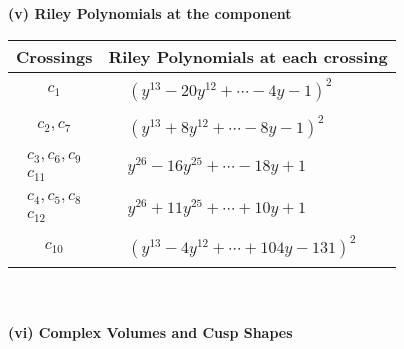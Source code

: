\documentclass[1p]{elsarticle_modified}
\theoremstyle{definition}
\begin{document}
\newpage\renewcommand{\arraystretch}{1}
\flushleft \textbf{(v) Riley Polynomials at the component}\newline \\
\begin{tabular}{m{50pt}|m{274pt}}
Crossings & \hspace{64pt}Riley Polynomials at each crossing \\
\hline $$\begin{aligned}c_{1}\end{aligned}$$&$\begin{aligned}
&(y^{13}-20 y^{12}+\cdots-4 y-1)^{2}
\end{aligned}$\\
\hline $$\begin{aligned}c_{2},c_{7}\end{aligned}$$&$\begin{aligned}
&(y^{13}+8 y^{12}+\cdots-8 y-1)^{2}
\end{aligned}$\\
\hline $$\begin{aligned}c_{3},c_{6},c_{9}\\c_{11}\end{aligned}$$&$\begin{aligned}
&y^{26}-16 y^{25}+\cdots-18 y+1
\end{aligned}$\\
\hline $$\begin{aligned}c_{4},c_{5},c_{8}\\c_{12}\end{aligned}$$&$\begin{aligned}
&y^{26}+11 y^{25}+\cdots+10 y+1
\end{aligned}$\\
\hline $$\begin{aligned}c_{10}\end{aligned}$$&$\begin{aligned}
&(y^{13}-4 y^{12}+\cdots+104 y-131)^{2}
\end{aligned}$\\
\hline
\end{tabular}\\~\\
\newpage\flushleft \textbf{(vi) Complex Volumes and Cusp Shapes}
\end{document}
